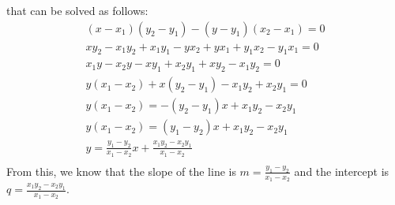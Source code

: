 that can be solved as follows:
\begin{equation}
    \begin{gathered}
        (x-x_1)(y_2-y_1) - (y-y_1)(x_2-x_1) = 0 \\
        xy_2 - x_1y_2 + x_1y_1 - yx_2 + yx_1 + y_1x_2 - y_1x_1 = 0 \\
        x_1y - x_2y - xy_1 + x_2y_1 + xy_2 - x_1y_2 = 0 \\
        y(x_1-x_2) + x(y_2 - y_1) -x_1y_2 + x_2y_1 = 0 \\
        y(x_1-x_2) = -(y_2-y_1)x + x_1y_2 - x_2y_1 \\
        y(x_1-x_2) = (y_1-y_2)x + x_1y_2 - x_2y_1 \\
        y = \frac{y_1-y_2}{x_1-x_2}x + \frac{x_1y_2 - x_2y_1}{x_1-x_2} \\
    \end{gathered}
\end{equation}
From this, we know that the slope of the line is $m = \frac{y_1-y_2}{x_1-x_2}$ and the intercept is $q = \frac{x_1y_2 - x_2y_1}{x_1-x_2}$.


